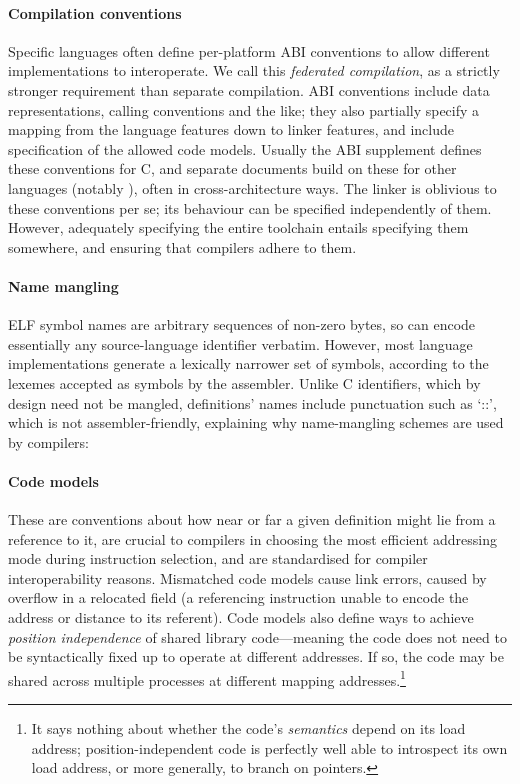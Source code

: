 \paragraph{Compilation conventions} 
Specific languages often define per-platform ABI conventions to
allow different implementations to interoperate.
We call this \emph{federated compilation}, as a strictly stronger 
requirement than separate compilation.
ABI conventions include data representations, calling conventions and the like; they also 
partially specify a mapping from the language features down to linker features,
and include specification of the allowed code models.
Usually the ABI supplement defines these conventions for C,
and separate documents build on these for other languages (notably \Cplusplus{}), 
often in cross-architecture ways.
The linker is oblivious to these conventions per se; 
its behaviour can be specified independently of them. 
However, adequately specifying the entire toolchain entails
specifying them somewhere, and ensuring that compilers adhere to them.

\paragraph{Name mangling}
ELF symbol names
are arbitrary sequences of non-zero bytes, so can encode 
essentially any source-language identifier verbatim. However, 
most language implementations generate a lexically narrower set of symbols,
according to the lexemes accepted as symbols by the assembler.
Unlike C identifiers, which by design need not be mangled, 
\Cplusplus{} definitions' names include punctuation such as `\textsf{::}', 
which is not assembler-friendly,
explaining why name-mangling schemes are used by \Cplusplus{} compilers: 

\paragraph{Code models} These are conventions about 
how near or far a given definition might lie from a reference to it, 
are crucial to compilers in choosing the most efficient addressing mode
during instruction selection, and are standardised for compiler interoperability reasons.
Mismatched code models cause link errors, caused by overflow in a relocated field 
(a referencing instruction unable to encode the address or distance to its referent).
Code models also define ways to achieve \emph{position independence} of shared library
code---meaning the code does not need to be syntactically
fixed up to operate at different addresses. If so, 
the code may be shared across multiple processes at different mapping addresses.\footnote{It says nothing about
whether the code's \emph{semantics} depend on its load address; 
position-independent code is perfectly well able to 
introspect its own load address, or more generally, to branch on pointers.}


